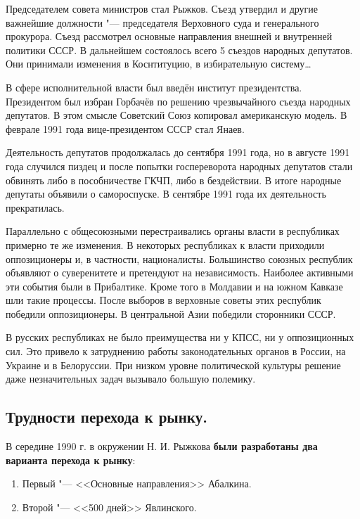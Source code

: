 Председателем совета министров стал Рыжков. Съезд утвердил и другие важнейшие должности "--- председателя Верховного суда и генерального прокурора. Съезд рассмотрел основные направления внешней и внутренней политики СССР. В дальнейшем состоялось всего 5 съездов народных депутатов. Они принимали изменения в Коснтитуцию, в избирательную систему\dots

В сфере исполнительной власти был введён институт президентства. Президентом был избран Горбачёв по решению чрезвычайного съезда народных депутатов. В этом смысле Советский Союз копировал американскую модель. В феврале 1991 года вице-президентом СССР стал Янаев.

Деятельность депутатов продолжалась до сентября 1991 года, но в августе 1991 года случился пиздец и после попытки госпереворота народных депутатов стали обвинять либо в пособничестве ГКЧП, либо в бездействии. В итоге народные депутаты объявили о самороспуске. В сентябре 1991 года их деятельность прекратилась.

Параллельно с общесоюзными перестраивались органы власти в республиках примерно те же изменения. В некоторых республиках к власти приходили оппозиционеры и, в частности, националисты. Большинство союзных республик объявляют о суверенитете и претендуют на независимость. Наиболее активными эти события были в Прибалтике. Кроме того в Молдавии и на южном Кавказе шли такие процессы. После выборов в верховные советы этих республик победили оппозиционеры. В центральной Азии победили сторонники СССР.

В русских республиках не было преимущества ни у КПСС, ни у оппозиционных сил. Это привело к затруднению работы законодательных органов в России, на Украине и в Белоруссии. При низком уровне политической культуры решение даже незначительных задач вызывало большую полемику.

\subsection{Трудности перехода к рынку.}

В середине 1990 г. в окружении Н. И. Рыжкова \textbf{были разработаны два варианта перехода к рынку}:

\begin{enumerate}
    \item Первый "--- <<Основные направления>> Абалкина.
    \item Второй "--- <<500 дней>> Явлинского.
\end{enumerate}

